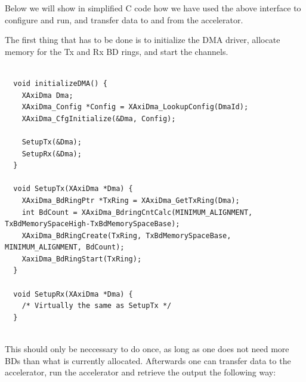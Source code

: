 Below we will show in simplified C code how we have used the above interface to configure and run, and transfer data to and from the accelerator. 

The first thing that has to be done is to initialize the DMA driver, allocate memory for the Tx and Rx BD rings, and start the channels.

\begin{lstlisting}

  void initializeDMA() {
    XAxiDma Dma;
    XAxiDma_Config *Config = XAxiDma_LookupConfig(DmaId);
    XAxiDma_CfgInitialize(&Dma, Config);

    SetupTx(&Dma);
    SetupRx(&Dma);
  }

  void SetupTx(XAxiDma *Dma) {
    XAxiDma_BdRingPtr *TxRing = XAxiDma_GetTxRing(Dma);
    int BdCount = XAxiDma_BdringCntCalc(MINIMUM_ALIGNMENT, TxBdMemorySpaceHigh-TxBdMemorySpaceBase);
    XAxiDma_BdRingCreate(TxRing, TxBdMemorySpaceBase, MINIMUM_ALIGNMENT, BdCount);
    XaxiDma_BdRingStart(TxRing);
  }

  void SetupRx(XAxiDma *Dma) {
    /* Virtually the same as SetupTx */
  }
  
\end{lstlisting}

This should only be neccessary to do once, as long as one does not need more BDs than what is currently allocated. Afterwards one can transfer data to the accelerator, run the accelerator and retrieve the output the following way: 

